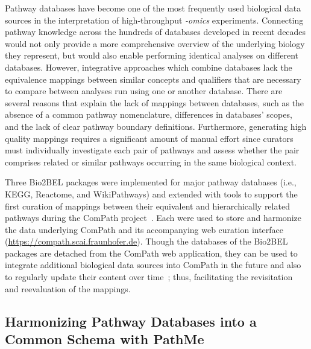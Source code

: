 Pathway databases have become one of the most frequently used biological data sources in the interpretation of high-throughput \textit{-omics} experiments.
Connecting pathway knowledge across the hundreds of databases developed in recent decades would not only provide a more comprehensive overview of the underlying biology they represent, but would also enable performing identical analyses on different databases.
However, integrative approaches which combine databases lack the equivalence mappings between similar concepts and qualifiers that are necessary to compare between analyses run using one or another database.
There are several reasons that explain the lack of mappings between databases, such as the absence of a common pathway nomenclature, differences in databases' scopes, and the lack of clear pathway boundary definitions.
Furthermore, generating high quality mappings requires a significant amount of manual effort since curators must individually investigate each pair of pathways and assess whether the pair comprises related or similar pathways occurring in the same biological context.

Three Bio2BEL packages were implemented for major pathway databases (i.e., KEGG, Reactome, and WikiPathways) and extended with tools to support the first curation of mappings between their equivalent and hierarchically related pathways during the ComPath project~\cite{Domingo-Fernandez2018}.
Each were used to store and harmonize the data underlying ComPath and its accompanying web curation interface (\url{https://compath.scai.fraunhofer.de}).
Though the databases of the Bio2BEL packages are detached from the ComPath web application, they can be used to integrate additional biological data sources into ComPath in the future and also to regularly update their content over time~\cite{Wadi2016}; thus, facilitating the revisitation and reevaluation of the mappings.

\subsection*{Harmonizing Pathway Databases into a Common Schema with PathMe}

